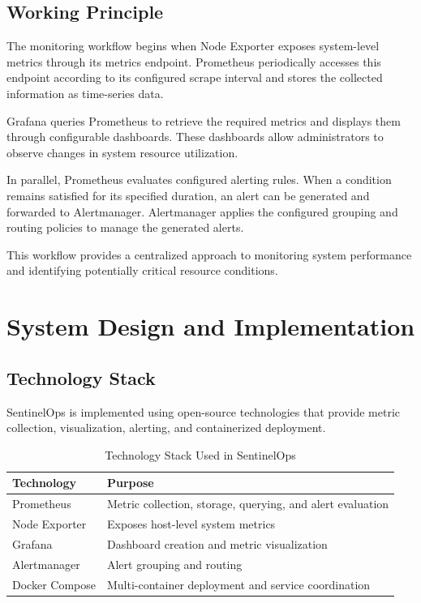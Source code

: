 \documentclass[conference]{IEEEtran}
\begin{document}
\subsection{Working Principle}

The monitoring workflow begins when Node Exporter exposes
system-level metrics through its metrics endpoint. Prometheus
periodically accesses this endpoint according to its configured
scrape interval and stores the collected information as
time-series data.

Grafana queries Prometheus to retrieve the required metrics
and displays them through configurable dashboards. These
dashboards allow administrators to observe changes in system
resource utilization.

In parallel, Prometheus evaluates configured alerting rules.
When a condition remains satisfied for its specified duration,
an alert can be generated and forwarded to Alertmanager.
Alertmanager applies the configured grouping and routing
policies to manage the generated alerts.

This workflow provides a centralized approach to monitoring
system performance and identifying potentially critical
resource conditions.


\section{System Design and Implementation}

\subsection{Technology Stack}

SentinelOps is implemented using open-source technologies
that provide metric collection, visualization, alerting,
and containerized deployment.

\begin{table}[!t]
\caption{Technology Stack Used in SentinelOps}
\label{tab:technology}
\centering
\footnotesize
\begin{tabular}{|p{2.0cm}|p{5.0cm}|}
\hline
\textbf{Technology} & \textbf{Purpose} \\
\hline
Prometheus & Metric collection, storage, querying,
and alert evaluation \\
\hline
Node Exporter & Exposes host-level system metrics \\
\hline
Grafana & Dashboard creation and metric visualization \\
\hline
Alertmanager & Alert grouping and routing \\
\hline
Docker Compose & Multi-container deployment and service
coordination \\
\hline
\end{tabular}
\end{table}
\end{document}
